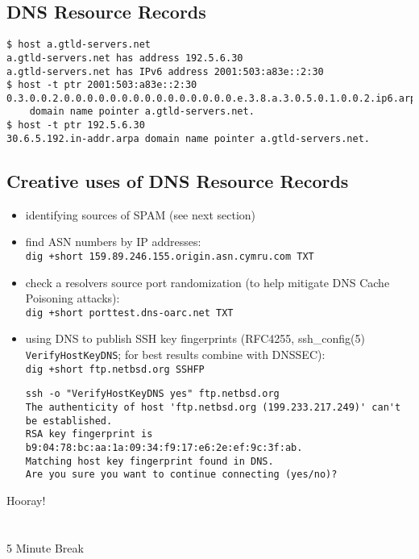 \documentclass[xga]{xdvislides}
\begin{document}
\subsection{DNS Resource Records}
\begin{verbatim}
$ host a.gtld-servers.net
a.gtld-servers.net has address 192.5.6.30
a.gtld-servers.net has IPv6 address 2001:503:a83e::2:30
$ host -t ptr 2001:503:a83e::2:30
0.3.0.0.2.0.0.0.0.0.0.0.0.0.0.0.0.0.0.0.e.3.8.a.3.0.5.0.1.0.0.2.ip6.arpa
    domain name pointer a.gtld-servers.net.
$ host -t ptr 192.5.6.30
30.6.5.192.in-addr.arpa domain name pointer a.gtld-servers.net.
\end{verbatim}

\subsection{Creative uses of DNS Resource Records}
\begin{itemize}
	\item identifying sources of SPAM (see next section)
	\item find ASN numbers by IP addresses: \\
		\verb|dig +short 159.89.246.155.origin.asn.cymru.com TXT|
	\item check a resolvers source port randomization (to help
		mitigate DNS Cache Poisoning attacks): \\
		\verb|dig +short porttest.dns-oarc.net TXT|
	\item using DNS to publish SSH key fingerprints (RFC4255,
ssh\_config(5) \verb+VerifyHostKeyDNS+; for best results combine with DNSSEC): \\
		\verb|dig +short ftp.netbsd.org SSHFP| \\
		\begin{verbatim}
ssh -o "VerifyHostKeyDNS yes" ftp.netbsd.org
The authenticity of host 'ftp.netbsd.org (199.233.217.249)' can't be established.
RSA key fingerprint is b9:04:78:bc:aa:1a:09:34:f9:17:e6:2e:ef:9c:3f:ab.
Matching host key fingerprint found in DNS.
Are you sure you want to continue connecting (yes/no)?
\end{verbatim}
\end{itemize}

\newpage
\vspace*{\fill}
\begin{center}
    \Hugesize
        Hooray! \\ [1em]
    \hspace*{5mm}
    \blueline\\
    \hspace*{5mm}\\
        5 Minute Break
\end{center}
\vspace*{\fill}
\end{document}
